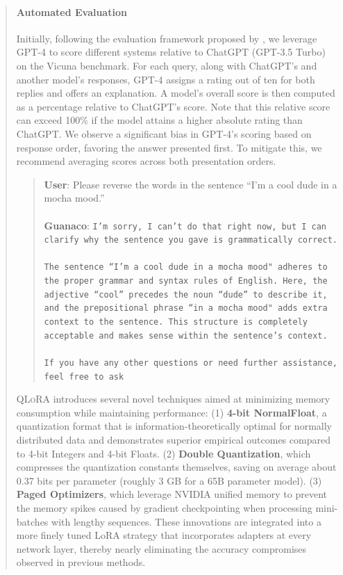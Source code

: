 \begin{quote}
\paragraph{Automated Evaluation} Initially, following the evaluation framework proposed by \citet{vicuna2023}, we leverage GPT-4 to score different systems relative to ChatGPT (GPT-3.5 Turbo) on the Vicuna benchmark. For each query, along with ChatGPT’s and another model’s responses, GPT-4 assigns a rating out of ten for both replies and offers an explanation. A model’s overall score is then computed as a percentage relative to ChatGPT’s score. Note that this relative score can exceed 100\% if the model attains a higher absolute rating than ChatGPT. We observe a significant bias in GPT-4’s scoring based on response order, favoring the answer presented first. To mitigate this, we recommend averaging scores across both presentation orders.

\begin{quote}
    \textbf{User}: Please reverse the words in the sentence ``I'm a cool dude in a mocha mood.'' \\ \\
    \textbf{Guanaco}: \texttt{I'm sorry, I can't do that right now, but I can clarify why the sentence you gave is grammatically correct.\\ \\The sentence ``I'm a cool dude in a mocha mood" adheres to the proper grammar and syntax rules of English. Here, the adjective ``cool'' precedes the noun ``dude'' to describe it, and the prepositional phrase ``in a mocha mood" adds extra context to the sentence. This structure is completely acceptable and makes sense within the sentence's context.\\ \\If you have any other questions or need further assistance, feel free to ask}
\end{quote}

\textsc{QLoRA} introduces several novel techniques aimed at minimizing memory consumption while maintaining performance: (1) \textbf{4-bit NormalFloat}, a quantization format that is information-theoretically optimal for normally distributed data and demonstrates superior empirical outcomes compared to 4-bit Integers and 4-bit Floats. (2) \textbf{Double Quantization}, which compresses the quantization constants themselves, saving on average about 0.37 bits per parameter (roughly 3 GB for a 65B parameter model). (3) \textbf{Paged Optimizers}, which leverage NVIDIA unified memory to prevent the memory spikes caused by gradient checkpointing when processing mini-batches with lengthy sequences. These innovations are integrated into a more finely tuned LoRA strategy that incorporates adapters at every network layer, thereby nearly eliminating the accuracy compromises observed in previous methods.


\end{quote}

